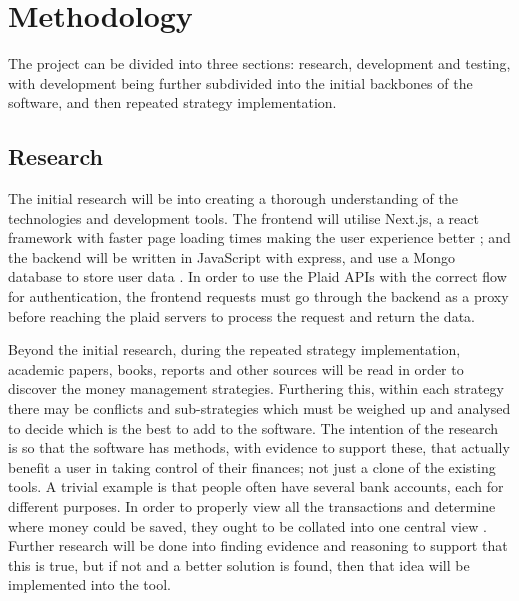 \section{Methodology}
The project can be divided into three sections: research, development and testing, with development being further subdivided into the initial backbones of the software, and then repeated strategy implementation.


\subsection{Research}
The initial research will be into creating a thorough understanding of the technologies and development tools. The frontend will utilise Next.js, a react framework with faster page loading times making the user experience better \cite{NextJSSpeed}; and the backend will be written in JavaScript with express, and use a Mongo database to store user data \cite{MongoDB}. In order to use the Plaid APIs with the correct flow for authentication, the frontend requests must go through the backend as a proxy before reaching the plaid servers to process the request and return the data. 

Beyond the initial research, during the repeated strategy implementation, academic papers, books, reports and other sources will be read in order to discover the money management strategies. Furthering this, within each strategy there may be conflicts and sub-strategies which must be weighed up and analysed to decide which is the best to add to the software. The intention of the research is so that the software has methods, with evidence to support these, that actually benefit a user in taking control of their finances; not just a clone of the existing tools. A trivial example is that people often have several bank accounts, each for different purposes. In order to properly view all the transactions and determine where money could be saved, they ought to be collated into one central view \cite{HavingMultipleAccounts}. Further research will be done into finding evidence and reasoning to support that this is true, but if not and a better solution is found, then that idea will be implemented into the tool.

